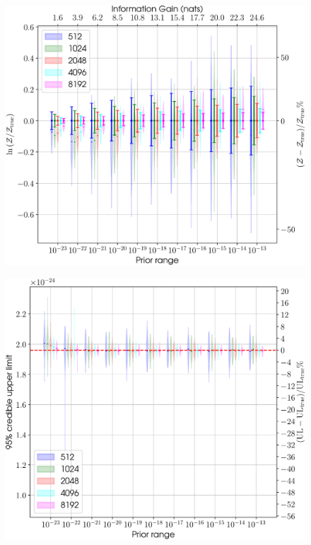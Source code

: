 \begin{figure}[!phtb]
\begin{center}
\includegraphics[width=1\columnwidth]{./figures/proptesting/walk_uniform_prop/evidences/collate_plots_wup_evidences}
\caption{ \protect}
\end{center}
\end{figure}

\begin{figure}[!phtb]
\begin{center}
\includegraphics[width=1\columnwidth]{./figures/proptesting/walk_uniform_prop/upperlimits/collate_plots_wup_uls}
\caption{ \protect}
\end{center}
\end{figure}

